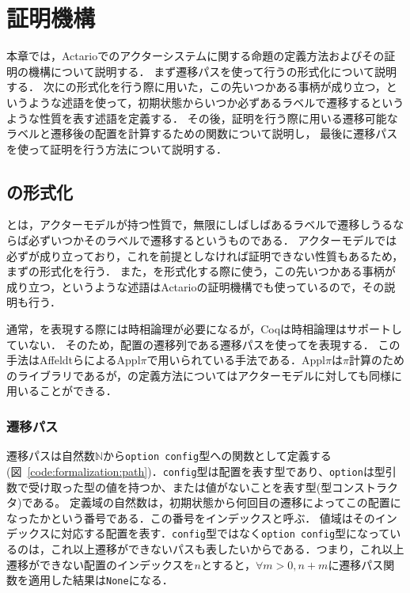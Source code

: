 \chapter{証明機構}
\label{chapter:proof}

本章では，Actarioでのアクターシステムに関する命題の定義方法およびその証明の機構について説明する．
まず遷移パスを使って行う\fairness の形式化について説明する．
次に\fairness の形式化を行う際に用いた，この先いつかある事柄が成り立つ，というような述語を使って，初期状態からいつか必ずあるラベルで遷移するというような性質を表す述語を定義する．
その後，証明を行う際に用いる遷移可能なラベルと遷移後の配置を計算するための関数について説明し，
最後に遷移パスを使って証明を行う方法について説明する．

\section{\fairness の形式化}
\fairness とは，アクターモデルが持つ性質で，無限にしばしばあるラベルで遷移しうるならば必ずいつかそのラベルで遷移するというものである．
アクターモデルでは必ず\fairness が成り立っており，これを前提としなければ証明できない性質もあるため，まず\fairness の形式化を行う．
また，\fairness を形式化する際に使う，この先いつかある事柄が成り立つ，というような述語はActarioの証明機構でも使っているので，その説明も行う．

通常，\fairness を表現する際には時相論理が必要になるが，Coqは時相論理はサポートしていない．
そのため，配置の遷移列である遷移パスを使って\fairness を表現する．
この手法はAffeldtらによるAppl$\pi$\cite{Affeldt200817}で用いられている手法である．Appl$\pi$は$\pi$計算のためのライブラリであるが，\fairness の定義方法についてはアクターモデルに対しても同様に用いることができる．

\subsection{遷移パス}
遷移パスは自然数$\mathbb{N}$から\texttt{option config}型への関数として定義する (図~\ref{code:formalization:path})．\texttt{config}型は配置を表す型であり、\texttt{option}は型引数で受け取った型の値を持つか、または値がないことを表す型(型コンストラクタ)である。
定義域の自然数は，初期状態から何回目の遷移によってこの配置になったかという番号である．この番号をインデックスと呼ぶ．
値域はそのインデックスに対応する配置を表す．\texttt{config}型ではなく\texttt{option config}型になっているのは，これ以上遷移ができないパスも表したいからである．つまり，これ以上遷移ができない配置のインデックスを$n$とすると，$\forall m > 0, n + m$に遷移パス関数を適用した結果は\texttt{None}になる．


